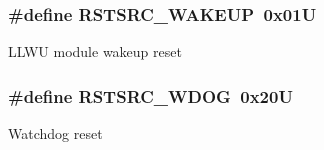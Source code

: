 \subsubsection[{\texorpdfstring{R\+S\+T\+S\+R\+C\+\_\+\+W\+A\+K\+E\+UP}{RSTSRC_WAKEUP}}]{\setlength{\rightskip}{0pt plus 5cm}\#define R\+S\+T\+S\+R\+C\+\_\+\+W\+A\+K\+E\+UP~0x01U}\hypertarget{group___p_e___const__module_gaeed5dacbb9d0e07213c8840434f6cd6a}{}\label{group___p_e___const__module_gaeed5dacbb9d0e07213c8840434f6cd6a}
L\+L\+WU module wakeup reset 
\subsubsection[{\texorpdfstring{R\+S\+T\+S\+R\+C\+\_\+\+W\+D\+OG}{RSTSRC_WDOG}}]{\setlength{\rightskip}{0pt plus 5cm}\#define R\+S\+T\+S\+R\+C\+\_\+\+W\+D\+OG~0x20U}\hypertarget{group___p_e___const__module_ga789b8aee910293e98e3d259ced79864c}{}\label{group___p_e___const__module_ga789b8aee910293e98e3d259ced79864c}
Watchdog reset 